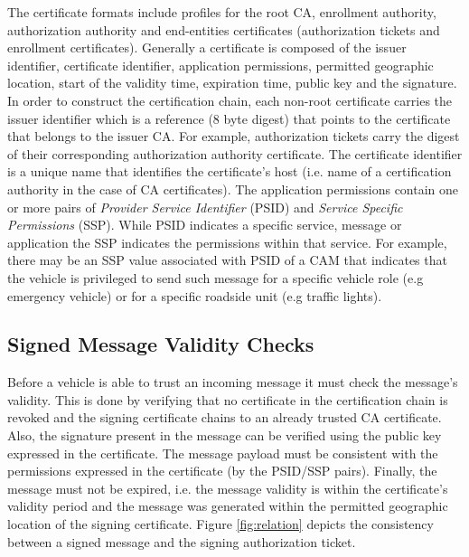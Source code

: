 The certificate formats include profiles for the root CA, enrollment authority, authorization authority and end-entities certificates (authorization tickets and enrollment certificates).
Generally a certificate is composed of the issuer identifier, certificate identifier, application permissions, permitted geographic location, start of the validity time, expiration time, public key and the signature. In order to construct the certification chain, each non-root certificate carries the issuer identifier which is a reference (8 byte digest) that points to the certificate that belongs to the issuer CA. For example, authorization tickets carry the digest of their corresponding authorization authority certificate. The certificate identifier is a unique name that identifies the certificate's host (i.e. name of a certification authority in the case of CA certificates). The application permissions contain one or more pairs of \textit{Provider Service Identifier} (PSID) and \textit{Service Specific Permissions } (SSP). While PSID indicates a specific service, message or application the SSP indicates the permissions within that service. For example, there may be an SSP value associated with PSID of a CAM that indicates that the vehicle is privileged to send such message for a specific vehicle role (e.g emergency vehicle) or for a specific roadside unit (e.g traffic lights).

\subsection{Signed Message Validity Checks}

Before a vehicle is able to trust an incoming message it must check the message's validity. This is done by verifying that no certificate in the certification chain is revoked and the signing certificate chains to an already trusted CA certificate.
Also, the signature present in the message can be verified using the public key expressed in the certificate. The message payload must be consistent with the permissions expressed in the certificate (by the PSID/SSP pairs). Finally, the message must not be expired, i.e. the message validity is within the certificate's validity period and the message was generated within the permitted geographic location of the signing certificate. Figure \ref{fig:relation} depicts the consistency between a signed message and the signing authorization ticket.

